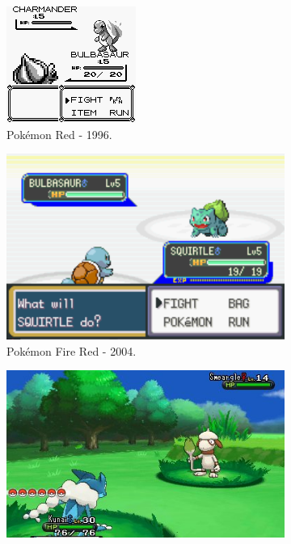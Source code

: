 \documentclass[
	12pt,				%
	openright,			%
	twoside,			%
	a4paper,			%
	english,			%
	french,				%
	spanish,			%
	brazil				%
	]{abntex2}
\begin{document}
\begin{figure}[h!]
  \centering
  \begin{subfigure}[b]{0.3\linewidth}
    \includegraphics[width=\linewidth]{redb.jpg}
     \caption{Pokémon Red - 1996.}
  \end{subfigure}
  \begin{subfigure}[b]{0.4\linewidth}
    \includegraphics[width=\linewidth]{fireredb.jpg}
    \caption{Pokémon Fire Red - 2004.}
  \end{subfigure}
  \begin{subfigure}[b]{0.6\linewidth}
    \includegraphics[width=\linewidth]{xyb.jpg}

\end{subfigure}
\end{figure}
\end{document}
